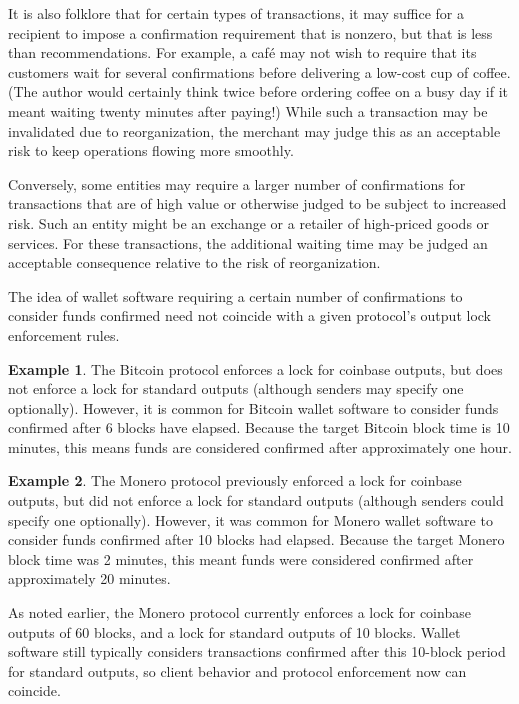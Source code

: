\documentclass{article}
\theoremstyle{definition}
\newtheorem*{example}{Example}
\begin{document}
It is also folklore that for certain types of transactions, it may suffice for a recipient to impose a confirmation requirement that is nonzero, but that is less than recommendations.
For example, a caf\'{e} may not wish to require that its customers wait for several confirmations before delivering a low-cost cup of coffee.
(The author would certainly think twice before ordering coffee on a busy day if it meant waiting twenty minutes after paying!)
While such a transaction may be invalidated due to reorganization, the merchant may judge this as an acceptable risk to keep operations flowing more smoothly.

Conversely, some entities may require a larger number of confirmations for transactions that are of high value or otherwise judged to be subject to increased risk.
Such an entity might be an exchange or a retailer of high-priced goods or services.
For these transactions, the additional waiting time may be judged an acceptable consequence relative to the risk of reorganization.

The idea of wallet software requiring a certain number of confirmations to consider funds confirmed need not coincide with a given protocol's output lock enforcement rules.

\begin{example}
The Bitcoin protocol enforces a lock for coinbase outputs, but does not enforce a lock for standard outputs (although senders may specify one optionally).
However, it is common for Bitcoin wallet software to consider funds confirmed after 6 blocks have elapsed.
Because the target Bitcoin block time is 10 minutes, this means funds are considered confirmed after approximately one hour.
\end{example}

\begin{example}
The Monero protocol previously enforced a lock for coinbase outputs, but did not enforce a lock for standard outputs (although senders could specify one optionally).
However, it was common for Monero wallet software to consider funds confirmed after 10 blocks had elapsed.
Because the target Monero block time was 2 minutes, this meant funds were considered confirmed after approximately 20 minutes.
\end{example}

As noted earlier, the Monero protocol currently enforces a lock for coinbase outputs of 60 blocks, and a lock for standard outputs of 10 blocks.
Wallet software still typically considers transactions confirmed after this 10-block period for standard outputs, so client behavior and protocol enforcement now can coincide.
\end{document}

